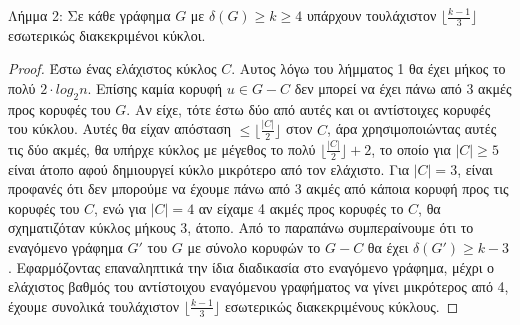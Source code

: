 \documentclass[a4paper, oneside, 11pt]{article}
\theoremstyle{definition}
\begin{document}
\begin{enumerate}
Λήμμα 2: Σε κάθε γράφημα $G$ με $\delta(G)\geq k\geq 4$ υπάρχουν τουλάχιστον $\lfloor \frac{k-1}{3}\rfloor$ εσωτερικώς διακεκριμένοι κύκλοι.
\begin{proof}
Έστω ένας ελάχιστος κύκλος $C$. Αυτος λόγω του λήμματος 1 θα έχει μήκος το πολύ $2\cdot log_2 n$. Επίσης καμία κορυφή $u\in G-C$ δεν μπορεί να έχει πάνω από 3 ακμές προς κορυφές του $G$.
Αν είχε, τότε έστω δύο από αυτές και οι αντίστοιχες κορυφές του κύκλου. Αυτές θα είχαν απόσταση $\leq \lfloor \frac{|C|}{2}\rfloor$ στον $C$, άρα χρησιμοποιώντας αυτές τις δύο ακμές, 
θα υπήρχε κύκλος με μέγεθος το πολύ
$\lfloor\frac{|C|}{2}\rfloor + 2$, το οποίο για $|C|\geq 5$ είναι άτοπο αφού δημιουργεί κύκλο μικρότερο από τον ελάχιστο. Για $|C|=3$, είναι προφανές ότι δεν μπορούμε να έχουμε πάνω από 3
ακμές από κάποια κορυφή προς τις κορυφές του $C$, ενώ για $|C|=4$ αν είχαμε 4 ακμές προς κορυφές το $C$, θα σχηματιζόταν κύκλος μήκους 3, άτοπο.
Από το παραπάνω συμπεραίνουμε ότι το εναγόμενο γράφημα $G'$ του $G$ με σύνολο κορυφών το $G-C$ θα έχει $\delta(G') \geq k-3$. Εφαρμόζοντας επαναληπτικά την ίδια διαδικασία στο εναγόμενο 
γράφημα, μέχρι ο ελάχιστος
βαθμός του αντίστοιχου εναγόμενου γραφήματος να γίνει μικρότερος από 4, έχουμε συνολικά τουλάχιστον $\lfloor \frac{k-1}{3}\rfloor$ εσωτερικώς διακεκριμένους κύκλους.
\end{proof}

\end{enumerate}
\end{document}
